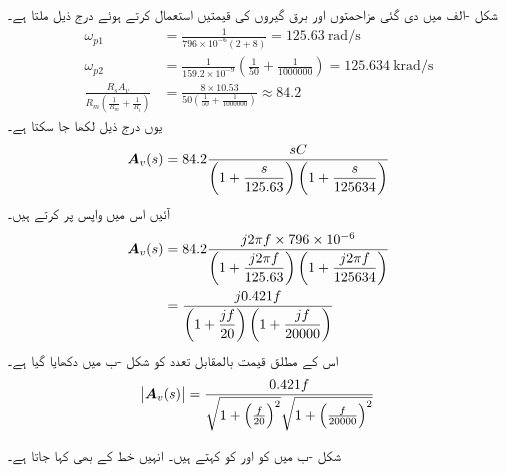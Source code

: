 شکل -الف میں دی گئی مزاحمتوں اور برق گیروں کی قیمتیں استعمال کرتے ہوئے درج ذیل ملتا ہے۔
\begin{align*}
\omega_{p1}&=\frac{1}{796\times 10^{-6}(2+8)}=\SI{125.63}{\radian\per\second}\\
\omega_{p2}&=\frac{1}{159.2\times 10^{-9}}\left(\frac{1}{50}+\frac{1}{1000000}\right)=\SI{125.634}{\kilo\radian\per\second}\\
\frac{R_s A_v}{R_m\left(\frac{1}{R_m}+\frac{1}{R_i}\right)}&=\frac{8 \times 10.53}{50\left(\frac{1}{50}+\frac{1}{1000000}\right)}\approx 84.2
\end{align*}
یوں درج ذیل لکھا جا سکتا ہے۔
\begin{align}\label{مساوت_تعددی_تبادلی_تفاعل_ایمپلیفائر}
{\ensuremath{{\boldsymbol{A}}}}_v(s)= 84.2 \dfrac{sC}{\left(1+\dfrac{s}{125.63}\right)\left(1+\dfrac{s}{125634}\right)}
\end{align}
آئیں اس میں واپس  پر کرتے ہیں۔
\begin{gather}
\begin{aligned}\label{مساوت_تعددی_انقطاعی_تعدد}
{\ensuremath{{\boldsymbol{A}}}}_v(s)&= 84.2 \dfrac{j 2 \pi f \times 796\times 10^{-6}}{\left(1+\dfrac{j 2\pi f}{125.63}\right)\left(1+\dfrac{j 2 \pi f}{125634}\right)}\\
&= \dfrac{j 0.421f}{\left(1+\dfrac{j f}{20}\right)\left(1+\dfrac{j f}{20000}\right)}\\
\end{aligned}
\end{gather}
اس کے مطلق قیمت  بالمقابل تعدد  کو شکل -ب میں دکھایا گیا ہے۔
\begin{align*}
\abs{{{\boldsymbol{A}}}_v(s)}=\frac{0.421 f }{\sqrt{1+\left(\frac{f}{20}\right)^2}\sqrt{1+\left(\frac{f}{20000}\right)^2}}
\end{align*}

شکل -ب میں  کو  اور  کو  کہتے ہیں۔ انہیں خط کے  بھی کہا جاتا ہے۔

